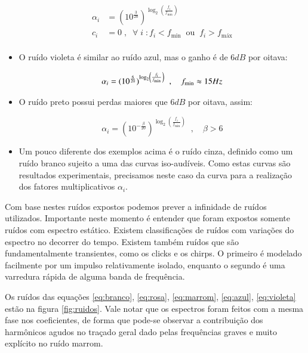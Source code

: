 \begin{itemize}
\begin{equation}\label{eq:azul}
\begin{split}
\alpha_i & = (10^{\frac{3}{20}})^{\log _2 \left ( \frac{f_i}{f_{\text{min}}} \right )} \\
c_i & =0\;,\;\; \forall \; i \; : f_i<f_{\text{min}} \;\; \text{ou} \;\; f_i>f_{\text{máx}} \\
\end{split}
\end{equation}

\item O ruído violeta é similar ao ruído azul, mas o ganho é de $6dB$ por oitava:

\begin{equation}\label{eq:violeta}
\alpha_i = (10^{\frac{6}{20}})^{\log _2 \left ( \frac{f_i}{f_{\text{min}}} \right )} \;\;, \quad f_{\text{min}} \approx 15 Hz \\
\end{equation}

\item O ruído preto possui perdas maiores que $6dB$ por oitava, assim:

\begin{equation}\label{eq:preto}
\alpha_i=(10^{-\frac{\beta}{20}})^{\log _2 \left( \frac{f_i}{f_{\text{min}}} \right )}\;\;, \quad \beta > 6
\end{equation}



\item Um pouco diferente dos exemplos acima é o ruído cinza, definido como
um ruído branco sujeito a uma das curvas iso-audíveis. Como estas curvas são resultados
experimentais, precisamos neste caso da curva para a realização dos fatores multiplicativos
$\alpha_i$.

\end{itemize}

Com base nestes ruídos expostos podemos prever a infinidade de ruídos utilizados. Importante
neste momento é entender que foram expostos somente ruídos com espectro estático. Existem classificações
de ruídos com variações do espectro no decorrer do tempo. Existem também ruídos que
são fundamentalmente transientes, como os clicks e os chirps. O primeiro é modelado
facilmente por um impulso relativamente isolado, enquanto o segundo é uma varredura rápida de 
alguma banda de frequência.

Os ruídos das equações \ref{eq:branco}, \ref{eq:rosa}, \ref{eq:marrom},
\ref{eq:azul}, \ref{eq:violeta} estão na figura \ref{fig:ruidos}. Vale notar
que os espectros foram feitos com a mesma fase nos coeficientes, de forma que
pode-se observar a contribuição dos harmônicos agudos no traçado geral dado
pelas frequências graves e muito explícito no ruído marrom.





